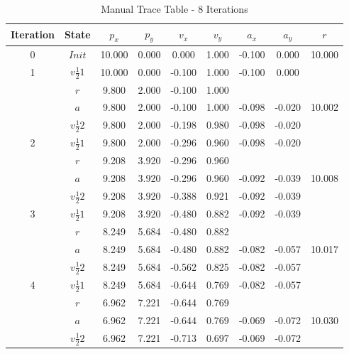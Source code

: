 \begin{table}[h]
\footnotesize
\centering
\caption{Manual Trace Table - 8 Iterations}
\def\arraystretch{1.5}
\begin{tabular}{|c|c|c|c|c|c|c|c|c|} \hline
Iteration & State    &   $p_x$ &  $p_y$ &  $v_x$ &  $v_y$ &  $a_x$ &  $a_y$ &  $r$   \\ \hline
0 & $Init$           &  10.000 &	0.000 &	 0.000 &	1.000 &	-0.100 &  0.000 & 10.000 \\ \hline
1 & $v\frac{1}{2}1$	 &  10.000 &  0.000 &	-0.100 &	1.000 &	-0.100 &  0.000 &        \\ \hline
  & $r$	             &   9.800 &	2.000	& -0.100 & 	1.000	&		     &        &        \\ \hline
  & $a$	             &   9.800 &	2.000 &	-0.100 &	1.000 &	-0.098 & -0.020 &	10.002 \\ \hline
  & $v\frac{1}{2}2$	 &   9.800 &	2.000 &	-0.198 &	0.980 &	-0.098 & -0.020	&        \\ \hline
2 & $v\frac{1}{2}1$	 &   9.800 &	2.000 &	-0.296 &	0.960 &	-0.098 & -0.020	&        \\ \hline
  & $r$	             &   9.208 &	3.920 &	-0.296 &	0.960	&		     &        &        \\ \hline
  & $a$	             &   9.208 &	3.920 &	-0.296 &	0.960 &	-0.092 & -0.039 &	10.008 \\ \hline
  & $v\frac{1}{2}2$  &	 9.208 &	3.920 &	-0.388 &	0.921 &	-0.092 & -0.039	&        \\ \hline
3 & $v\frac{1}{2}1$  &	 9.208 &	3.920	& -0.480 &	0.882 &	-0.092 & -0.039 &	       \\ \hline
  & $r$              & 	 8.249 &	5.684	& -0.480 &	0.882 &			   &        &        \\ \hline
  & $a$              &	 8.249 &	5.684	& -0.480 &	0.882	& -0.082 & -0.057	& 10.017 \\ \hline
  & $v\frac{1}{2}2$  &	 8.249 &	5.684	& -0.562 &	0.825	& -0.082 & -0.057	&        \\ \hline
4 & $v\frac{1}{2}1$  &	 8.249 &	5.684	& -0.644 &	0.769	& -0.082 & -0.057	&        \\ \hline
  & $r$	             &   6.962 &	7.221	& -0.644 &	0.769	&		     &        &        \\ \hline
  & $a$              &   6.962 &	7.221	& -0.644 &	0.769	& -0.069 & -0.072 &	10.030 \\ \hline
  & $v\frac{1}{2}2$  &	 6.962 &	7.221 &	-0.713 &	0.697 &	-0.069 & -0.072	&        \\ \hline

\end{tabular}
\end{table}
